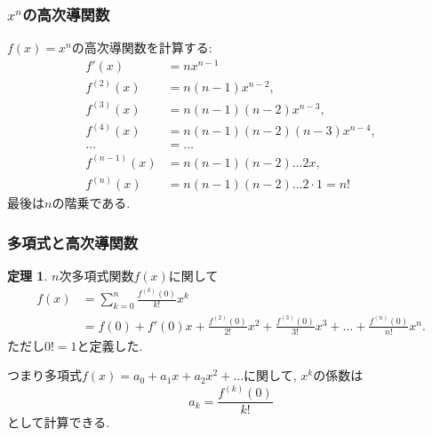\documentclass[dvipdfmx,cjk,10.2pt]{beamer}
\theoremstyle{definition}
\newtheorem{Thm}{定理}[section]
\begin{document}





\begin{frame}
\frametitle{$x^n$の高次導関数}


$f(x)=x^n$の高次導関数を計算する: 
\begin{align*}
f'(x) & = nx^{n-1} \\
f^{(2)}(x) & =n(n-1)x^{n-2}, \\
f^{(3)}(x) & = n(n-1)(n-2)x^{n-3}, \\
f^{(4)}(x) & =  n(n-1)(n-2)(n-3)x^{n-4}, \\
\dots & = \dots \\
f^{(n-1)}(x) & =  n(n-1)(n-2) \dots 2x, \\
f^{(n)}(x) & =  n(n-1)(n-2) \dots 2\cdot 1=n! 
\end{align*}
最後は$n$の階乗である. 
\end{frame}








\begin{frame}
\frametitle{多項式と高次導関数}


\begin{Thm} \label{多項式の係数}
$n$次多項式関数$f(x)$に関して
\begin{align*}
f(x) & = \sum_{k=0}^n\frac{f^{(k)}(0)}{k!}x^k \\
& =  f(0)+ f'(0)x + \frac{f^{(2)}(0)}{2!}x^2 +  \frac{f^{(3)}(0)}{3!}x^3+ \dots + \frac{f^{(n)}(0)}{n!}x^n. 
\end{align*}
ただし$0!=1$と定義した. 
\end{Thm}
つまり多項式$f(x)=a_0+a_1x+a_2x^2+\dots$に関して, $x^k$の係数は
$$
a_k=\frac{f^{(k)}(0)}{k!} 
$$
として計算できる. 

\end{frame}



\end{document}
